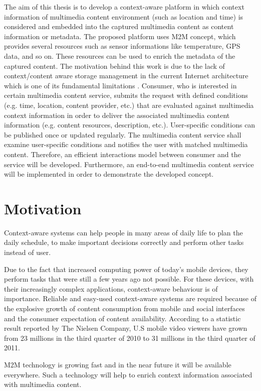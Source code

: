 The aim of this thesis is to develop a context-aware platform in which context information of multimedia content environment (such as location and time) is considered and embedded into the captured multimedia content as content information or metadata. The proposed platform uses \ac{M2M} concept, which provides several resources such as sensor informations like temperature, \ac{GPS} data, and so on. These resources can be used to enrich the metadata of the captured content. The motivation behind this work is due to the lack of context/content aware storage management in the current Internet architecture which is one of its fundamental limitations \cite{ec1}. Consumer, who is interested in certain multimedia content service, submits the request with defined conditions (e.g. time, location, content provider, etc.) that are evaluated against multimedia context information in order to deliver the associated multimedia content information (e.g. content resources, description, etc.). User-specific conditions can be published once or updated regularly. The multimedia content service shall examine user-specific conditions and notifies the user with matched multimedia content. Therefore, an efficient interactions model between consumer and the service will be developed. Furthermore, an end-to-end multimedia content service will be implemented in order to demonstrate the developed concept.

\section{Motivation\label{sec:moti}}

Context-aware systems can help people in many areas of daily life to plan the daily schedule, to make important decisions correctly and perform other tasks instead of user.

Due to the fact that increased computing power of today's mobile devices, they perform tasks that were still a few years ago not possible. For these devices, with their increasingly complex applications, context-aware behaviour is of importance. Reliable and easy-used context-aware systems are required because of the explosive growth of content consumption from mobile and social interfaces and the consumer expectation of content availability. According to a statistic result reported by The Nielsen Company, U.S mobile video viewers have grown from 23 millions in the third quarter of 2010 to 31 millions in the third quarter of 2011.

\ac{M2M} technology is growing fast and in the near future it will be available everywhere. Such a technology will help to enrich context information associated with multimedia content.

